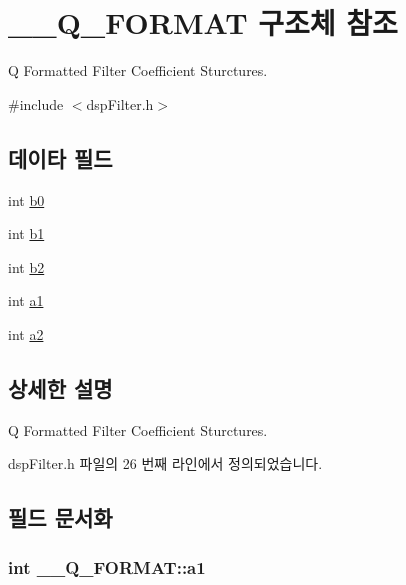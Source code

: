\hypertarget{struct_____q___f_o_r_m_a_t}{\section{\+\_\+\+\_\+\+Q\+\_\+\+F\+O\+R\+M\+A\+T 구조체 참조}
\label{struct_____q___f_o_r_m_a_t}
}


Q Formatted Filter Coefficient Sturctures.  




{\ttfamily \#include $<$dsp\+Filter.\+h$>$}

\subsection*{데이타 필드}
\begin{DoxyCompactItemize}
\item 
int \hyperlink{struct_____q___f_o_r_m_a_t_a0fc0b104bef03cc7de69bbb5e06cf942}{b0}
\item 
int \hyperlink{struct_____q___f_o_r_m_a_t_af204737e7c2b102b6c9a5272b9fe6856}{b1}
\item 
int \hyperlink{struct_____q___f_o_r_m_a_t_aea8cafcb12a82b3f125480d1c0ac0d97}{b2}
\item 
int \hyperlink{struct_____q___f_o_r_m_a_t_a3bdaae0a32b731c7aadb02b96334e254}{a1}
\item 
int \hyperlink{struct_____q___f_o_r_m_a_t_adf82b4d95ce195a01c00f0c2f4e043f5}{a2}
\end{DoxyCompactItemize}


\subsection{상세한 설명}
Q Formatted Filter Coefficient Sturctures. 

dsp\+Filter.\+h 파일의 26 번째 라인에서 정의되었습니다.



\subsection{필드 문서화}
\hypertarget{struct_____q___f_o_r_m_a_t_a3bdaae0a32b731c7aadb02b96334e254}{
\subsubsection[{a1}]{\setlength{\rightskip}{0pt plus 5cm}int \+\_\+\+\_\+\+Q\+\_\+\+F\+O\+R\+M\+A\+T\+::a1}}\label{struct_____q___f_o_r_m_a_t_a3bdaae0a32b731c7aadb02b96334e254}


